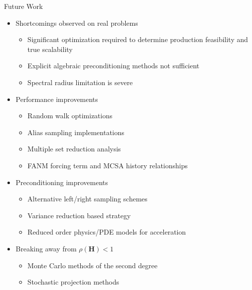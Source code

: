 \documentclass{beamer}
\begin{document}
\begin{frame}{Future Work}

  \begin{itemize}
  \item Shortcomings observed on real problems
    \begin{itemize}
    \item Significant optimization required to determine production
      feasibility and true scalability
    \item Explicit algebraic preconditioning methods not sufficient
    \item Spectral radius limitation is severe
    \end{itemize}
    \medskip
  \item Performance improvements
    \begin{itemize}
    \item Random walk optimizations
    \item Alias sampling implementations
    \item Multiple set reduction analysis
    \item FANM forcing term and MCSA history relationships
    \end{itemize}
    \medskip
  \item Preconditioning improvements
    \begin{itemize}
    \item Alternative left/right sampling schemes
    \item Variance reduction based strategy
    \item Reduced order physics/PDE models for acceleration
    \end{itemize}
    \medskip
  \item Breaking away from $\rho(\mathbf{H}) < 1$
    \begin{itemize}
    \item Monte Carlo methods of the second degree
    \item Stochastic projection methods
    \end{itemize}
  \end{itemize}

\end{frame}
\end{document}
